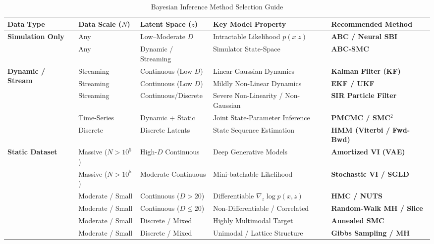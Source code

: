 \documentclass{article}
\begin{document}
\begin{table}[htbp]
\centering
\caption{Bayesian Inference Method Selection Guide}
\label{tab:bayes_selection}
\small
\renewcommand{\arraystretch}{1.3}
\begin{tabularx}{\textwidth}{l l l X l}
\toprule
\textbf{Data Type} & \textbf{Data Scale ($N$)} & \textbf{Latent Space ($z$)} & \textbf{Key Model Property} & \textbf{Recommended Method} \\
\midrule
\multirow{2}{*}{\textbf{Simulation Only}} & Any & Low--Moderate $D$ & Intractable Likelihood $p(x|z)$ & \textbf{ABC / Neural SBI} \\
 & Any & Dynamic / Streaming & Simulator State-Space & \textbf{ABC-SMC} \\
\midrule
\multirow{5}{*}{\textbf{Dynamic / Stream}} & Streaming & Continuous (Low $D$) & Linear-Gaussian Dynamics & \textbf{Kalman Filter (KF)} \\
 & Streaming & Continuous (Low $D$) & Mildly Non-Linear Dynamics & \textbf{EKF / UKF} \\
 & Streaming & Continuous/Discrete & Severe Non-Linearity / Non-Gaussian & \textbf{SIR Particle Filter} \\
 & Time-Series & Dynamic + Static & Joint State-Parameter Inference & \textbf{PMCMC / SMC$^2$} \\
 & Discrete & Discrete Latents & State Sequence Estimation & \textbf{HMM (Viterbi / Fwd-Bwd)} \\
\midrule
\multirow{6}{*}{\textbf{Static Dataset}} & Massive ($N > 10^5$) & High-$D$ Continuous & Deep Generative Models & \textbf{Amortized VI (VAE)} \\
 & Massive ($N > 10^5$) & Moderate Continuous & Mini-batchable Likelihood & \textbf{Stochastic VI / SGLD} \\
 \cline{2-5}
 & Moderate / Small & Continuous ($D > 20$) & Differentiable $\nabla_z \log p(x,z)$ & \textbf{HMC / NUTS} \\
 & Moderate / Small & Continuous ($D \le 20$) & Non-Differentiable / Correlated & \textbf{Random-Walk MH / Slice} \\
 & Moderate / Small & Discrete / Mixed & Highly Multimodal Target & \textbf{Annealed SMC} \\
 & Moderate / Small & Discrete / Mixed & Unimodal / Lattice Structure & \textbf{Gibbs Sampling / MH} \\
\bottomrule
\end{tabularx}
\end{table}
\end{document}
